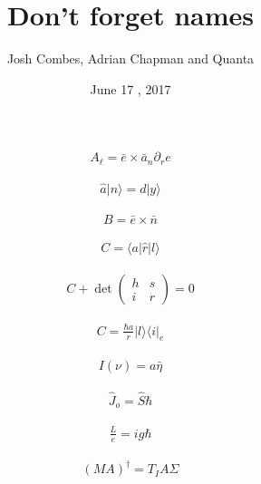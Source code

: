 \documentclass[twocolumn,pra,aps,superscriptaddress]{revtex4-1}
\newcommand{\bra}[1]{\langle{#1}|}
\newcommand{\ket}[1]{|{#1}\rangle}
\newcommand{\op}[2]{\ket{#1}\!\bra{#2}}
\newcommand{\expt}[1]{\langle{#1}\rangle}
\begin{document}
\title{Don't forget names}
\author{Josh Combes, Adrian Chapman and Quanta}

\date{June 17 , 2017} %
\begin{abstract}
\end{abstract}
\maketitle




\LARGE
\begin{align}
A_\ell = \bar{e}\times \bar{a}_n \partial_r e
\end{align}

\begin{align}
\hat a\ket{n} = d\ket{y}
\end{align}

\begin{align}
B=\bar{e}\times \bar{n}
\end{align}

\begin{align}
C = \expt{a|\hat r| l}
\end{align}

\begin{align}
C + \det \left(\begin{array}{cc}h & s \\i & r\end{array}\right) = 0
\end{align}

\begin{align}
C = \frac{\hbar a} { r}  \op{l}{ i}_e
\end{align}

\begin{align}
I(\nu) = a\bar{\eta}
\end{align}

\begin{align}
\hat J_o = \hat S \hbar
\end{align}

\begin{align}
\frac{L}{e} = i g\hbar
\end{align}

\begin{align}
(MA)^\dag = T_IA\Sigma
\end{align}
\end{document}
